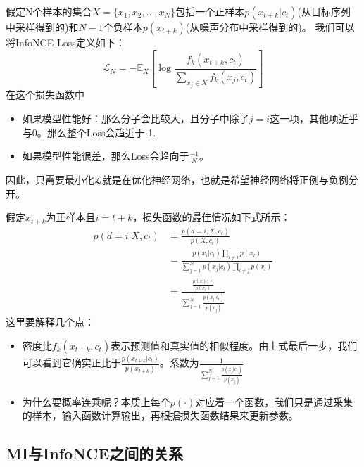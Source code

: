 \documentclass{article}
\begin{document}
假定N个样本的集合$X = \{x_1, x_2, \ldots, x_N\}$包括一个正样本$p(x_{t+k}|c_t)$(从目标序列中采样得到的)和$N-1$个负样本$p(x_{t+k})$(从噪声分布中采样得到的)。
我们可以将InfoNCE Loss定义如下：
\begin{equation}
    \mathcal{L}_N = - \mathbb{E}_{X} \left[ \log \frac{f_k(x_{t+k}, c_t)}{\sum_{x_j\in X} f_k(x_j, c_t)} \right]
\end{equation}
在这个损失函数中
\begin{itemize}
    \item 如果模型性能好：那么分子会比较大，且分子中除了$j=i$这一项，其他项近乎与0。那么整个Loss会趋近于-1.
    \item 如果模型性能很差，那么Loss会趋向于$\frac{-1}{N}$。
\end{itemize}
因此，只需要最小化$\mathcal{L}$就是在优化神经网络，也就是希望神经网络将正例与负例分开。


假定$x_{t+k}$为正样本且$i=t+k$，损失函数的最佳情况如下式所示：
\begin{equation}
    \begin{split}
        p(d=i|X,c_t) &= \frac{p(d=i, X, c_t)}{p(X,c_t)} \\
        &= \frac{ p(x_i|c_t) \prod_{l \neq i} p(x_l) }{\sum_{j=1}^N p(x_j|c_t) \prod_{l \neq j} p(x_l) } \\
        &= \frac{\frac{p(x_i|c_t)}{p(x_i)}}{\sum_{j=1}^N \frac{p(x_j|c_t)}{p(x_j)}}
    \end{split}
    \label{EQ:ExampleEQU}
\end{equation}
这里要解释几个点：
\begin{itemize}
    \item 密度比$f_k(x_{t+k}, c_t)$表示预测值和真实值的相似程度。由上式最后一步，我们可以看到它确实正比于$\frac{p(x_{t+k}|c_{t})}{p(x_{t+k})}$。系数为$\frac{1}{\sum_{j=1}^N \frac{p(x_j|c_t)}{p(x_j)}}$
    \item 为什么要概率连乘呢？本质上每个$p(\cdot)$对应着一个函数，我们只是通过采集的样本，输入函数计算输出，再根据损失函数结果来更新参数。
\end{itemize}


\subsection{MI与InfoNCE之间的关系}
\end{document}

